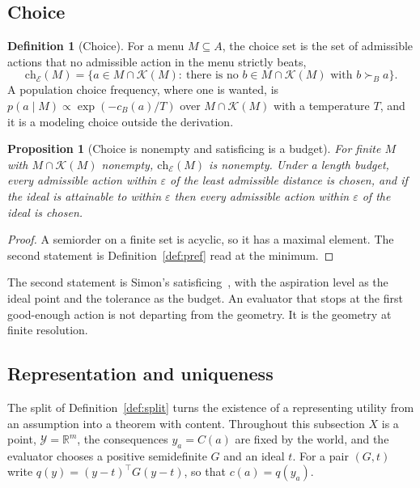\documentclass[11pt]{article}
\newtheorem{proposition}{Proposition}
\theoremstyle{definition}
\newtheorem{definition}{Definition}
\theoremstyle{remark}
\newcommand{\Ev}{\mathcal{E}}
\newcommand{\K}{\mathcal{K}}
\newcommand{\Y}{\mathcal{Y}}
\newcommand{\R}{\mathbb{R}}
\begin{document}
\subsection{Choice}

\begin{definition}[Choice]
\label{def:choice}
For a menu $M\subseteq A$, the choice set is the set of admissible actions that no admissible action in the menu strictly beats,
\[
\mathrm{ch}_{\Ev}(M)=\bigl\{a\in M\cap\K(M):\ \text{there is no } b\in M\cap\K(M)\text{ with } b\succ_{B}a\bigr\}.
\]
A population choice frequency, where one is wanted, is $p(a\mid M)\propto\exp(-c_{B}(a)/T)$ over $M\cap\K(M)$ with a temperature $T$, and it is a modeling choice outside the derivation.
\end{definition}

\begin{proposition}[Choice is nonempty and satisficing is a budget]
\label{prop:choice}
For finite $M$ with $M\cap\K(M)$ nonempty, $\mathrm{ch}_{\Ev}(M)$ is nonempty.
Under a length budget, every admissible action within $\varepsilon$ of the least admissible distance is chosen, and if the ideal is attainable to within $\varepsilon$ then every admissible action within $\varepsilon$ of the ideal is chosen.
\end{proposition}

\begin{proof}
A semiorder on a finite set is acyclic, so it has a maximal element. The second statement is Definition~\ref{def:pref} read at the minimum.
\end{proof}

The second statement is Simon's satisficing~\cite{simon1955}, with the aspiration level as the ideal point and the tolerance as the budget.
An evaluator that stops at the first good-enough action is not departing from the geometry.
It is the geometry at finite resolution.

\subsection{Representation and uniqueness}
\label{sec:repr}

The split of Definition~\ref{def:split} turns the existence of a representing utility from an assumption into a theorem with content.
Throughout this subsection $X$ is a point, $\Y=\R^{m}$, the consequences $y_{a}=C(a)$ are fixed by the world, and the evaluator chooses a positive semidefinite $G$ and an ideal $t$.
For a pair $(G,t)$ write $q(y)=(y-t)^{\top}G(y-t)$, so that $c(a)=q(y_{a})$.
\end{document}

